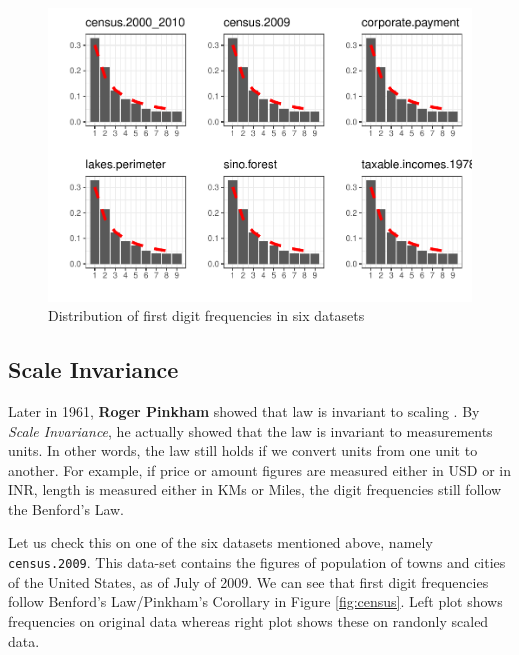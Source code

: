 \documentclass[
]{book}
\begin{document}
\begin{figure}

{\centering \includegraphics{DauR_files/figure-latex/benplots-1} 

}

\caption{Distribution of first digit frequencies in six datasets}\label{fig:benplots}
\end{figure}

\hypertarget{scale-invariance}{%
\subsection{Scale Invariance}\label{scale-invariance}}

Later in 1961, \textbf{Roger Pinkham} showed that law is invariant to scaling \citep{pinkham}. By \emph{Scale Invariance}, he actually showed that the law is invariant to measurements units. In other words, the law still holds if we convert units from one unit to another. For example, if price or amount figures are measured either in USD or in INR, length is measured either in KMs or Miles, the digit frequencies still follow the Benford's Law.

Let us check this on one of the six datasets mentioned above, namely \texttt{census.2009}. This data-set contains the figures of population of towns and cities of the United States, as of July of 2009. We can see that first digit frequencies follow Benford's Law/Pinkham's Corollary in Figure \ref{fig:census}. Left plot shows frequencies on original data whereas right plot shows these on randonly scaled data.
\end{document}
